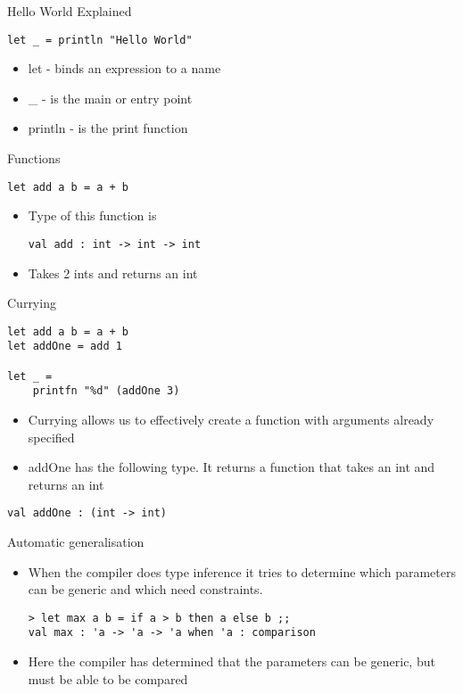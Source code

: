 \documentclass[landscape]{slides}
\begin{document}
\begin{slide}{Hello World Explained}
\begin{verbatim}
let _ = println "Hello World"
\end{verbatim}
\begin{itemize}
\item let - binds an expression to a name
\item \_ - is the main or entry point
\item println - is the print function
\end{itemize}
\end{slide}

\begin{slide}{Functions}
\begin{verbatim}
let add a b = a + b
\end{verbatim}
\begin{itemize}
\item Type of this function is
\begin{verbatim}
val add : int -> int -> int
\end{verbatim}
\item Takes 2 ints and returns an int
\end{itemize}
\end{slide}

\begin{slide}{Currying}
\begin{verbatim}
let add a b = a + b
let addOne = add 1

let _ =
    printfn "%d" (addOne 3)
\end{verbatim}
\begin{itemize}
\item Currying allows us to effectively create a function with arguments already specified
\item addOne has the following type. It returns a function that takes an int and returns an int
\end{itemize}
\begin{verbatim}
val addOne : (int -> int)
\end{verbatim}
\end{slide}

\begin{slide}{Automatic generalisation}
\begin{itemize}
\item When the compiler does type inference it tries to determine which parameters can be generic and which need constraints.
\begin{verbatim}
> let max a b = if a > b then a else b ;;
val max : 'a -> 'a -> 'a when 'a : comparison
\end{verbatim}
\item Here the compiler has determined that the parameters can be generic, but must be able to be compared
\end{itemize}
\end{slide}
\end{document}
